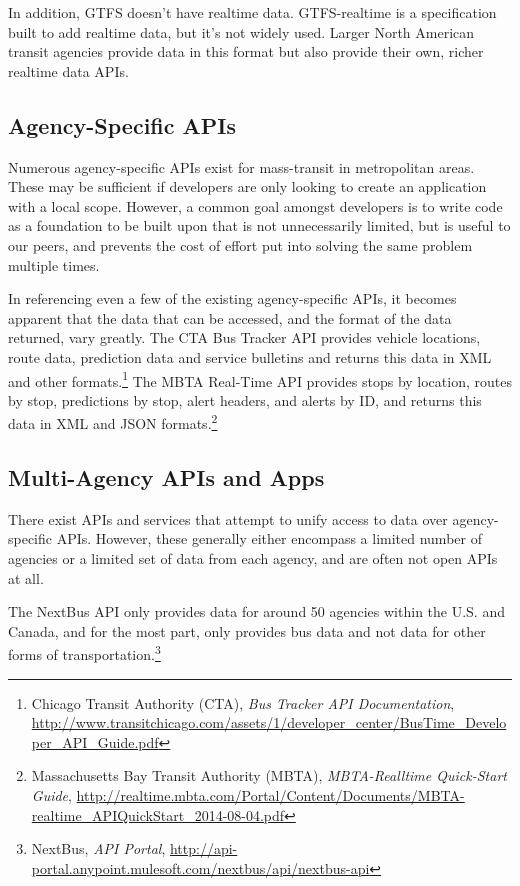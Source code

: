 \documentclass[12pt]{article}
\begin{document}
In addition, GTFS doesn't have realtime data. GTFS-realtime is a specification built to add
realtime data, but it's not widely used. Larger North American transit agencies provide
data in this format but also provide their own, richer realtime data APIs.

\subsection{Agency-Specific APIs}

Numerous agency-specific APIs exist for mass-transit in metropolitan areas.
These may be sufficient if developers are only looking to create an application with a local scope. However,
a common goal amongst developers is to write code as a foundation to be built upon that is not unnecessarily limited,
but is useful to our peers, and prevents the cost of effort put into solving the same
problem multiple times.

In referencing even a few of the existing agency-specific APIs, it
becomes apparent that the data that can be accessed, and the format of the data returned, 
vary greatly. The CTA Bus Tracker API provides vehicle locations, route data, prediction data and 
service bulletins and returns this data in XML and other formats.\footnote{Chicago Transit Authority (CTA), \textit{Bus Tracker API Documentation},
\url{http://www.transitchicago.com/assets/1/developer\_center/BusTime\_Developer\_API\_Guide.pdf}} The MBTA Real-Time API provides
stops by location, routes by stop, predictions by stop, alert headers, and alerts by ID, and returns
this data in XML and JSON formats.\footnote{Massachusetts Bay Transit Authority (MBTA), \textit{MBTA-Realltime Quick-Start Guide},
\url{http://realtime.mbta.com/Portal/Content/Documents/MBTA-realtime\_APIQuickStart\_2014-08-04.pdf}}

\subsection{Multi-Agency APIs and Apps}
There exist APIs and services that attempt to unify access to data over agency-specific APIs.
However, these generally either encompass a limited number of agencies or a limited set of
data from each agency, and are often not open APIs at all.

The NextBus API only provides data for
around 50 agencies within the U.S. and Canada, and for the most part, only provides bus data 
and not data for other forms of transportation.\footnote{NextBus, \textit{API Portal},
	\url{http://api-portal.anypoint.mulesoft.com/nextbus/api/nextbus-api}}
\end{document}
